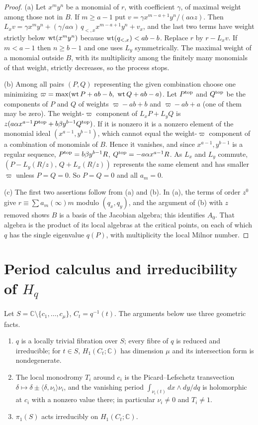 \documentclass[11pt]{article}
\numberwithin{equation}{section}
\theoremstyle{definition}
\theoremstyle{remark}
\newcommand{\C}{\mathbb C}\newcommand{\Q}{\mathbb Q}\newcommand{\R}{\mathbb R}\newcommand{\Z}{\mathbb Z}
\newcommand{\Hq}{H_q}
\begin{document}
\begin{proof}
(a) Let $x^my^n$ be a monomial of $r$, with coefficient $\gamma$, of maximal
weight among those not in $B$. If $m\ge a-1$ put $v=\gamma x^{m-a+1}y^n/(a\alpha z)$.
Then $L_xv=\gamma x^my^n+(\gamma/a\alpha)\,q_{<,x}x^{m-a+1}y^n+v_x$, and the last
two terms have weight strictly below $\operatorname{wt}(x^my^n)$ because
$\operatorname{wt}(q_{<,x})<ab-b$. Replace $r$ by $r-L_xv$. If $m<a-1$ then $n\ge b-1$ and one
uses $L_y$ symmetrically. The maximal weight of a monomial outside $B$, with its
multiplicity among the finitely many monomials of that weight, strictly
decreases, so the process stops.

(b) Among all pairs $(P,Q)$ representing the given combination choose one
minimizing $\varpi=\max(\operatorname{wt} P+ab-b,\ \operatorname{wt} Q+ab-a)$. Let $P^{\rm top}$ and $Q^{\rm top}$ be the components of $P$ and $Q$ of weights
$\varpi-ab+b$ and $\varpi-ab+a$ (one of them may be zero). The weight-$\varpi$
component of $L_xP+L_yQ$ is $z(a\alpha x^{a-1}P^{\rm top}+b\beta y^{b-1}Q^{\rm top})$. If it
is nonzero it is a nonzero element of the monomial ideal $(x^{a-1},y^{b-1})$,
which cannot equal the weight-$\varpi$ component of a combination of monomials
of $B$. Hence it vanishes, and since $x^{a-1},y^{b-1}$ is a regular sequence,
$P^{\rm top}=b\beta y^{b-1}R$, $Q^{\rm top}=-a\alpha x^{a-1}R$. As $L_x$ and $L_y$
commute, $(P-L_y(R/z),\,Q+L_x(R/z))$ represents the same element and has smaller
$\varpi$ unless $P=Q=0$. So $P=Q=0$ and all $a_m=0$.

(c) The first two assertions follow from (a) and (b). In (a), the terms of
order $z^0$ give $r\equiv\sum a_m(\infty)m$ modulo $(q_x,q_y)$, and the argument
of (b) with $z$ removed shows $B$ is a basis of the Jacobian algebra; this
identifies $A_0$. That algebra is the product of its local algebras at the
critical points, on each of which $q$ has the single eigenvalue $q(P)$, with
multiplicity the local Milnor number.
\end{proof}

\section{Period calculus and irreducibility of \texorpdfstring{$\Hq$}{Hq}}

Let $S=\C\setminus\{c_1,\dots,c_\mu\}$, $C_t=q^{-1}(t)$. The arguments below
use three geometric facts.
\begin{enumerate}[label=\textup{(G\arabic*)},leftmargin=2.8em]
\item $q$ is a locally trivial fibration over $S$; every fibre of $q$ is
 reduced and irreducible; for $t\in S$, $H_1(C_t;\C)$ has dimension $\mu$ and
 its intersection form is nondegenerate.
\item The local monodromy $T_i$ around $c_i$ is the Picard--Lefschetz
 transvection $\delta\mapsto\delta\pm\langle\delta,\nu_i\rangle\nu_i$, and the vanishing
 period $\int_{\nu_i(t)}dx\wedge dy/dq$ is holomorphic at $c_i$ with a nonzero
 value there; in particular $\nu_i\ne0$ and $T_i\ne1$.
\item $\pi_1(S)$ acts irreducibly on $H_1(C_t;\C)$.
\end{enumerate}
\end{document}
